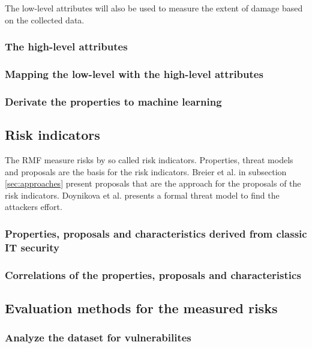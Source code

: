 The low-level attributes will also be used to measure the extent of damage based on the collected data.
\subsubsection*{The high-level attributes}


\subsubsection*{Mapping the low-level with the high-level attributes}


\subsubsection*{Derivate the properties to machine learning}


\subsection{Risk indicators}
\label{sec:risk_indicators}

The RMF measure risks by so called risk indicators. Properties, threat models and proposals are the basis for the risk indicators. Breier et al. in subsection \ref{sec:approaches} present
proposals that are the approach for the proposals of the risk indicators. Doynikova et al. presents a formal threat model to find the attackers effort.

\subsubsection*{Properties, proposals and characteristics derived from classic IT security}


\subsubsection*{Correlations of the properties, proposals and characteristics}


\subsection{Evaluation methods for the measured risks}


\subsubsection*{Analyze the dataset for vulnerabilites}



